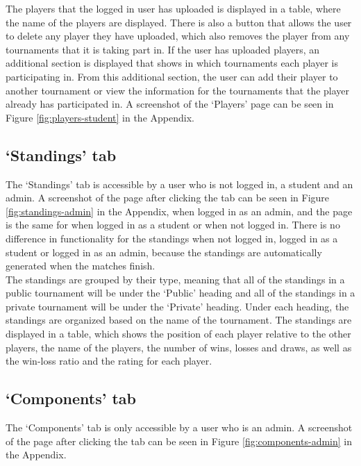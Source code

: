 \documentclass[a4paper, 11pt]{report}
\begin{document}
The players that the logged in user has uploaded is displayed in a table, where
the name of the players are displayed. There is also a button that allows the
user to delete any player they have uploaded, which also removes the player from
any tournaments that it is taking part in. If the user has uploaded players, an
additional section is displayed that shows in which tournaments each player is
participating in. From this additional section, the user can add their player
to another tournament or view the information for the tournaments that the player
already has participated in. A screenshot of the `Players' page can be seen in
Figure \ref{fig:players-student} in the Appendix.

\subsection{`Standings' tab}
\label{sec:impl-tab-standings}

The `Standings' tab is accessible by a user who is not logged in, a student
and an admin. A screenshot of the page after clicking the tab can be seen in
Figure \ref{fig:standings-admin} in the Appendix, when logged in as an admin,
and the page is the same for when logged in as a student or when not logged in.
There is no difference in functionality for the standings when not logged in,
logged in as a student or logged in as an admin, because the standings are
automatically generated when the matches finish. \\

The standings are grouped by their type, meaning that all of the standings in a
public tournament will be under the `Public' heading and all of the standings in
a private tournament will be under the `Private' heading. Under each heading, the
standings are organized based on the name of the tournament. The standings are
displayed in a table, which shows the position of each player relative to the
other players, the name of the players, the number of wins, losses and draws, as
well as the win-loss ratio and the rating for each player.

\subsection{`Components' tab}
\label{sec:impl-tab-components}

The `Components' tab is only accessible by a user who is an admin. A screenshot
of the page after clicking the tab can be seen in Figure \ref{fig:components-admin}
in the Appendix. \\
\end{document}
